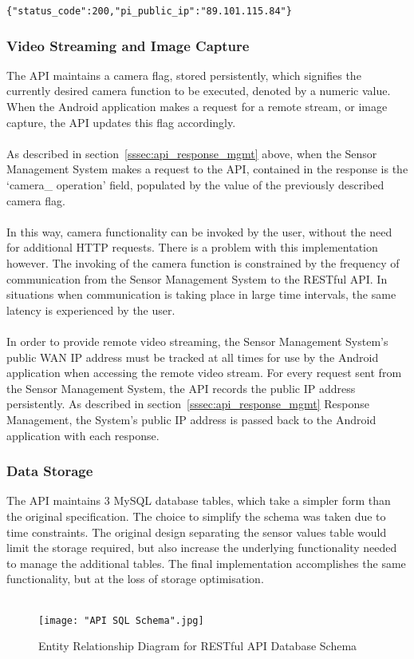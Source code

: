 \documentclass{article}
\begin{document}
\begin{lstlisting}[caption={JSON API Response to Android Application},label={lst:json_api_response_android}]
{"status_code":200,"pi_public_ip":"89.101.115.84"}
\end{lstlisting}

\subsubsection{Video Streaming and Image Capture}
The API maintains a camera flag, stored persistently, which signifies the currently desired camera function to be executed, denoted by a numeric value. When the Android application makes a request for a remote stream, or image capture, the API updates this flag accordingly. \\\\
As described in section~\ref{sssec:api_response_mgmt} above, when the Sensor Management System makes a request to the API, contained in the response is the ‘camera\_ operation’ field, populated by the value of the previously described camera flag. \\\\
In this way, camera functionality can be invoked by the user, without the need for additional HTTP requests. There is a problem with this implementation however. The invoking of the camera function is constrained by the frequency of communication from the Sensor Management System to the RESTful API. In situations when communication is taking place in large time intervals, the same latency is experienced by the user. \\\\
In order to provide remote video streaming, the Sensor Management System\rq s public WAN IP address must be tracked at all times for use by the Android application when accessing the remote video stream. For every request sent from the Sensor Management System, the API records the public IP address persistently. As described in section~\ref{sssec:api_response_mgmt} Response Management, the System\rq s public IP address is passed back to the Android application with each response. 

\newpage

\subsubsection{Data Storage}
The API maintains 3 MySQL database tables, which take a simpler form than the original specification. The choice to simplify the schema was taken due to time constraints. The original design separating the sensor values table would limit the storage required, but also increase the underlying functionality needed to manage the additional tables. The final implementation accomplishes the same functionality, but at the loss of storage optimisation. \\\\
\begin{figure}[H]
\centering
\texttt{[image: "API SQL Schema".jpg]}
\caption{Entity Relationship Diagram for RESTful API Database Schema}
\label{fig:api_schema}
\end{figure}
\end{document}
